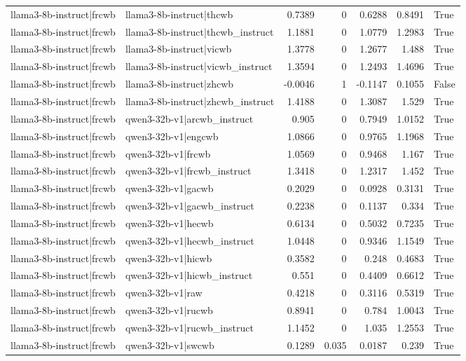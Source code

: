\begin{table}
\begin{tabular}{l l r r r r l}
llama3-8b-instruct|frcwb & llama3-8b-instruct|thcwb & 0.7389 & 0 & 0.6288 & 0.8491 & True \\
llama3-8b-instruct|frcwb & llama3-8b-instruct|thcwb_instruct & 1.1881 & 0 & 1.0779 & 1.2983 & True \\
llama3-8b-instruct|frcwb & llama3-8b-instruct|vicwb & 1.3778 & 0 & 1.2677 & 1.488 & True \\
llama3-8b-instruct|frcwb & llama3-8b-instruct|vicwb_instruct & 1.3594 & 0 & 1.2493 & 1.4696 & True \\
llama3-8b-instruct|frcwb & llama3-8b-instruct|zhcwb & -0.0046 & 1 & -0.1147 & 0.1055 & False \\
llama3-8b-instruct|frcwb & llama3-8b-instruct|zhcwb_instruct & 1.4188 & 0 & 1.3087 & 1.529 & True \\
llama3-8b-instruct|frcwb & qwen3-32b-v1|arcwb_instruct & 0.905 & 0 & 0.7949 & 1.0152 & True \\
llama3-8b-instruct|frcwb & qwen3-32b-v1|engcwb & 1.0866 & 0 & 0.9765 & 1.1968 & True \\
llama3-8b-instruct|frcwb & qwen3-32b-v1|frcwb & 1.0569 & 0 & 0.9468 & 1.167 & True \\
llama3-8b-instruct|frcwb & qwen3-32b-v1|frcwb_instruct & 1.3418 & 0 & 1.2317 & 1.452 & True \\
llama3-8b-instruct|frcwb & qwen3-32b-v1|gacwb & 0.2029 & 0 & 0.0928 & 0.3131 & True \\
llama3-8b-instruct|frcwb & qwen3-32b-v1|gacwb_instruct & 0.2238 & 0 & 0.1137 & 0.334 & True \\
llama3-8b-instruct|frcwb & qwen3-32b-v1|hecwb & 0.6134 & 0 & 0.5032 & 0.7235 & True \\
llama3-8b-instruct|frcwb & qwen3-32b-v1|hecwb_instruct & 1.0448 & 0 & 0.9346 & 1.1549 & True \\
llama3-8b-instruct|frcwb & qwen3-32b-v1|hicwb & 0.3582 & 0 & 0.248 & 0.4683 & True \\
llama3-8b-instruct|frcwb & qwen3-32b-v1|hicwb_instruct & 0.551 & 0 & 0.4409 & 0.6612 & True \\
llama3-8b-instruct|frcwb & qwen3-32b-v1|raw & 0.4218 & 0 & 0.3116 & 0.5319 & True \\
llama3-8b-instruct|frcwb & qwen3-32b-v1|rucwb & 0.8941 & 0 & 0.784 & 1.0043 & True \\
llama3-8b-instruct|frcwb & qwen3-32b-v1|rucwb_instruct & 1.1452 & 0 & 1.035 & 1.2553 & True \\
llama3-8b-instruct|frcwb & qwen3-32b-v1|swcwb & 0.1289 & 0.035 & 0.0187 & 0.239 & True \\

\end{tabular}
\end{table}
